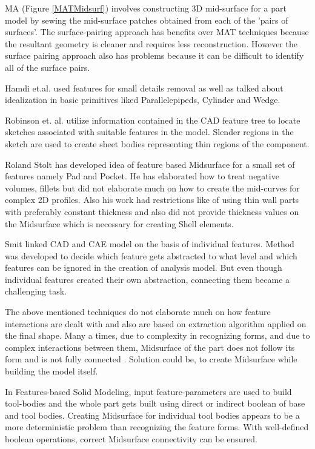 MA (Figure \ref{MATMidsurf}) involves constructing 3D mid-surface for a part model by sewing the mid-surface patches obtained from each of the 'pairs of surfaces'. The surface-pairing approach has benefits over MAT techniques because the resultant geometry is cleaner and requires less reconstruction. However the surface pairing approach also has problems because it can be difficult to identify all of the surface pairs.

Hamdi et.al. \cite{Hamdi2005} used features for small details removal as well as talked about idealization in basic primitives liked Parallelepipeds, Cylinder and Wedge. 

Robinson et. al.  \cite{Robinson2006} utilize information contained in the CAD feature tree to locate sketches associated with suitable features in the model. Slender regions in the sketch are used to create sheet bodies representing thin regions of the component. 

Roland Stolt \cite{Stolt2005, Sunnersjo2005, Stolt2006} has developed idea of feature based Midsurface for a small set of features namely Pad and Pocket. He has elaborated how to treat negative volumes, fillets but did not elaborate much on how to create the mid-curves for complex 2D profiles. Also his work had restrictions like of using thin wall parts with preferably constant thickness and also did not provide thickness values on the Midsurface which is necessary for creating Shell elements.

	Smit \cite{Smit2011} linked CAD and CAE model on the basis of individual features. Method was developed to decide which feature gets abstracted to what level and which features can be ignored in the creation of analysis model. But even though individual features created their own abstraction, connecting them became a challenging task.
	
The above mentioned techniques do not elaborate much on how feature interactions are dealt with and also are based on extraction algorithm applied on the final shape. Many a times, due to complexity in recognizing forms, and due to complex interactions between them, Midsurface of the part does not follow its form and is not fully connected \cite{Sheen2008} . Solution could be, to create Midsurface while building the model itself.

In Features-based Solid Modeling, input feature-parameters are used to build tool-bodies and the whole part gets built using direct or indirect boolean of base and tool bodies. Creating Midsurface for individual tool bodies appears to be a more deterministic problem than recognizing the feature forms. With well-defined boolean operations, correct Midsurface connectivity can be ensured.  

